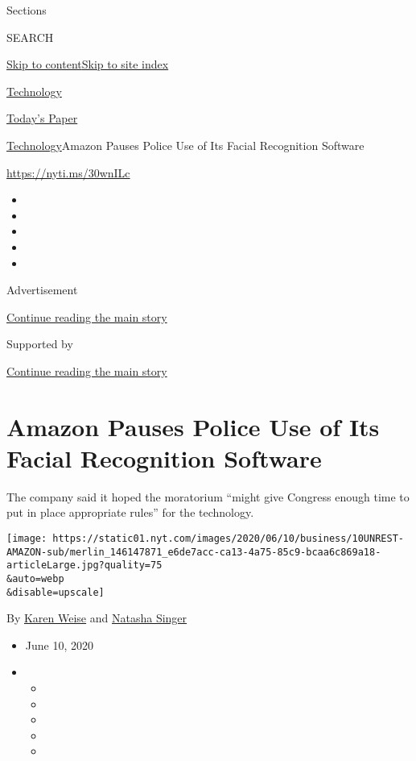 Sections

SEARCH

\protect\hyperlink{site-content}{Skip to
content}\protect\hyperlink{site-index}{Skip to site index}

\href{https://www.nytimes.com/section/technology}{Technology}

\href{https://myaccount.nytimes.com/auth/login?response_type=cookie\&client_id=vi}{}

\href{https://www.nytimes.com/section/todayspaper}{Today's Paper}

\href{/section/technology}{Technology}\textbar{}Amazon Pauses Police Use
of Its Facial Recognition Software

\url{https://nyti.ms/30wnILc}

\begin{itemize}
\item
\item
\item
\item
\item
\end{itemize}

Advertisement

\protect\hyperlink{after-top}{Continue reading the main story}

Supported by

\protect\hyperlink{after-sponsor}{Continue reading the main story}

\hypertarget{amazon-pauses-police-use-of-its-facial-recognition-software}{%
\section{Amazon Pauses Police Use of Its Facial Recognition
Software}\label{amazon-pauses-police-use-of-its-facial-recognition-software}}

The company said it hoped the moratorium ``might give Congress enough
time to put in place appropriate rules'' for the technology.

\texttt{[image: https://static01.nyt.com/images/2020/06/10/business/10UNREST-AMAZON-sub/merlin\_146147871\_e6de7acc-ca13-4a75-85c9-bcaa6c869a18-articleLarge.jpg?quality=75\\\&auto=webp\\\&disable=upscale]}

By \href{https://www.nytimes.com/by/karen-weise}{Karen Weise} and
\href{https://www.nytimes.com/by/natasha-singer}{Natasha Singer}

\begin{itemize}
\item
  June 10, 2020
\item
  \begin{itemize}
  \item
  \item
  \item
  \item
  \item
  \end{itemize}
\end{itemize}

